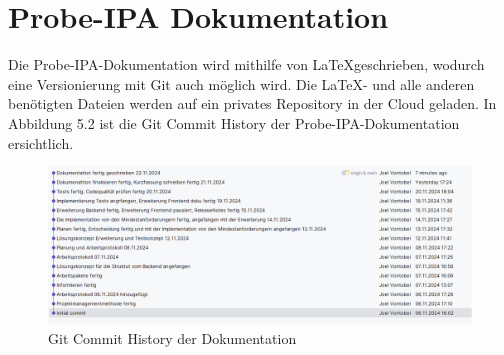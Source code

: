 \section{Probe-IPA Dokumentation}
Die Probe-IPA-Dokumentation wird mithilfe von \LaTeX geschrieben, wodurch eine Versionierung mit Git auch möglich wird. Die \LaTeX- und alle anderen benötigten Dateien werden auf ein privates Repository in der Cloud geladen. In Abbildung 5.2 ist die Git Commit History der Probe-IPA-Dokumentation ersichtlich.

\begin{figure}[H]
	\begin{center}
		\includegraphics[width=\textwidth]{ressourcen/commit-log-doku}
		\caption[Git Commit History der Dokumentation]{Git Commit History der Dokumentation}\label{fig:Git-Commit-History-der-Dokumentation}
	\end{center}
\end{figure}
